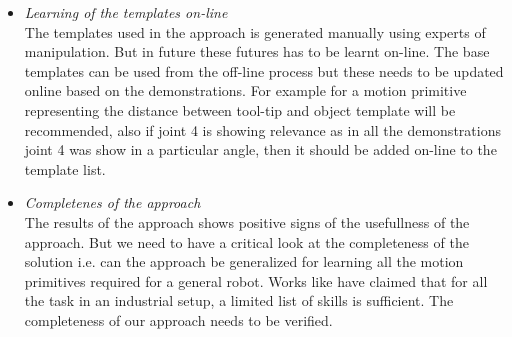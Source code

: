 \begin{itemize}
    \item \textit{Learning of the templates on-line} \\
The templates used in the approach is generated manually using experts of manipulation.
But in future these futures has to be learnt on-line. The base templates can be used 
from the off-line process but these needs to be updated online based on the demonstrations.
For example for a motion primitive representing the distance between tool-tip and object template will 
be recommended, also if joint 4 is showing relevance as in all the demonstrations joint 4 
was show in a particular angle, then it should be added on-line to the 
template list.

    \item \textit{Completenes of the approach} \\
The results of the approach shows positive signs of the usefullness of the approach.
But we need to have a critical look at the completeness of the solution i.e. can the
approach be generalized for learning all the motion primitives required for a general 
robot. Works like \cite{bogh_does_2012} have claimed that for all the task in an 
industrial setup, a limited list of skills is sufficient. The completeness of our 
approach needs to be verified.

\end{itemize}



